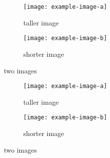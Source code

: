 \documentclass{article}
\begin{document}
\begin{figure}
  \centering
  \begin{subfigure}[t]{0.45\textwidth}
    \texttt{[image: example-image-a]}
    \caption{taller image}
  \end{subfigure}
  \begin{subfigure}[t]{0.45\textwidth}
    \texttt{[image: example-image-b]}
    \caption{shorter image}
  \end{subfigure}
  \caption{two images}
\end{figure}
\begin{figure}
  \centering
  \begin{subfigure}[T]{0.45\textwidth}
    \texttt{[image: example-image-a]}
    \caption{taller image}
  \end{subfigure}
  \begin{subfigure}[T]{0.45\textwidth}
    \texttt{[image: example-image-b]}
    \caption{shorter image}
  \end{subfigure}
  \caption{two images}
\end{figure}
\end{document}
